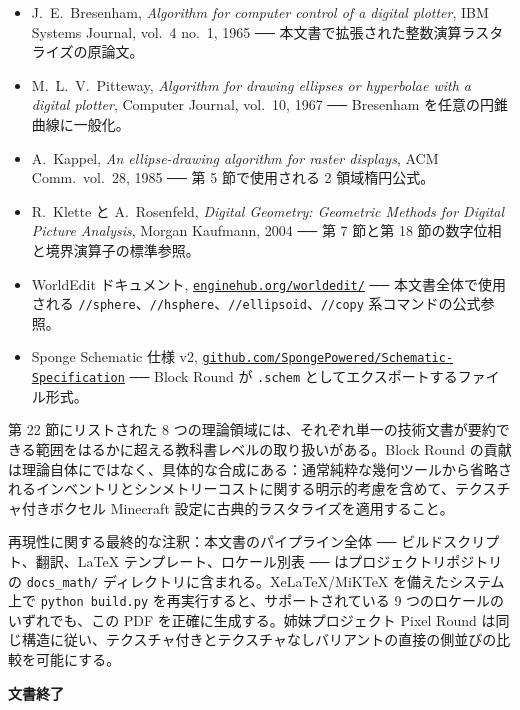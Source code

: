 \documentclass[12pt,a4paper]{scrartcl}
\newcommand{\code}[1]{\texttt{\small #1}}
\newcommand{\cmd}[1]{\textcolor{earth}{\texttt{\small #1}}}
\newcommand{\biblink}[2]{\href{#1}{\nolinkurl{#2}}}
\begin{document}
\begin{itemize}[leftmargin=1.4em,itemsep=0.2em,topsep=0.3em]
  \item J.~E.~Bresenham, \emph{Algorithm for computer control of a digital plotter}, IBM Systems Journal, vol.~4 no.~1, 1965 ── 本文書で拡張された整数演算ラスタライズの原論文。
  \item M.~L.~V.~Pitteway, \emph{Algorithm for drawing ellipses or hyperbolae with a digital plotter}, Computer Journal, vol.~10, 1967 ── Bresenham を任意の円錐曲線に一般化。
  \item A.~Kappel, \emph{An ellipse-drawing algorithm for raster displays}, ACM Comm.\ vol.~28, 1985 ── 第 5 節で使用される 2 領域楕円公式。
  \item R.~Klette と A.~Rosenfeld, \emph{Digital Geometry: Geometric Methods for Digital Picture Analysis}, Morgan Kaufmann, 2004 ── 第 7 節と第 18 節の数字位相と境界演算子の標準参照。
  \item WorldEdit ドキュメント, \biblink{https://enginehub.org/worldedit/}{enginehub.org/worldedit/} ── 本文書全体で使用される \cmd{//sphere}、\cmd{//hsphere}、\cmd{//ellipsoid}、\cmd{//copy} 系コマンドの公式参照。
  \item Sponge Schematic 仕様 v2, \biblink{https://github.com/SpongePowered/Schematic-Specification}{github.com/SpongePowered/Schematic-Specification} ── Block Round が \code{.schem} としてエクスポートするファイル形式。
\end{itemize}

第 22 節にリストされた 8 つの理論領域には、それぞれ単一の技術文書が要約できる範囲をはるかに超える教科書レベルの取り扱いがある。Block Round の貢献は理論自体にではなく、具体的な合成にある：通常純粋な幾何ツールから省略されるインベントリとシンメトリーコストに関する明示的考慮を含めて、テクスチャ付きボクセル Minecraft 設定に古典的ラスタライズを適用すること。

再現性に関する最終的な注釈：本文書のパイプライン全体 ── ビルドスクリプト、翻訳、LaTeX テンプレート、ロケール別表 ── はプロジェクトリポジトリの \code{docs\_math/} ディレクトリに含まれる。XeLaTeX/MiKTeX を備えたシステム上で \code{python build.py} を再実行すると、サポートされている 9 つのロケールのいずれでも、この PDF を正確に生成する。姉妹プロジェクト Pixel Round は同じ構造に従い、テクスチャ付きとテクスチャなしバリアントの直接の側並びの比較を可能にする。

\vspace{1.2em}

\begin{center}
{\sffamily\bfseries\color{accent}文書終了}
\end{center}
\end{document}
